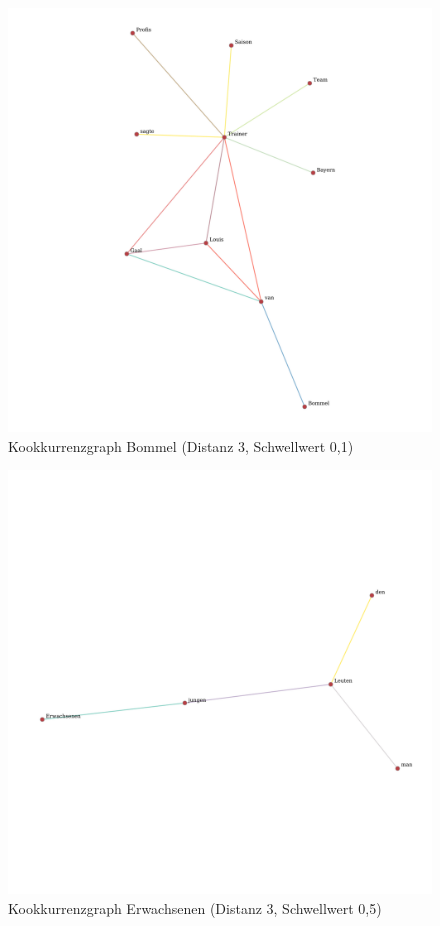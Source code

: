 \documentclass[11pt, a4paper]{article}
\begin{document}
\begin{figure}[hp!]
    \centering
        \includegraphics[scale=.4]{../../data/results/longpath_wordgraphs/den/graph_Bommel.pdf}
    \caption{Kookkurrenzgraph Bommel (Distanz 3, Schwellwert 0,1)}
\end{figure}

\begin{figure}[hp!]
    \centering
        \includegraphics[scale=.4]{../../data/results/longpath_wordgraphs/den/graph_Erwachsenen.pdf}
    \caption{Kookkurrenzgraph Erwachsenen (Distanz 3, Schwellwert 0,5)}
\end{figure}
\end{document}
